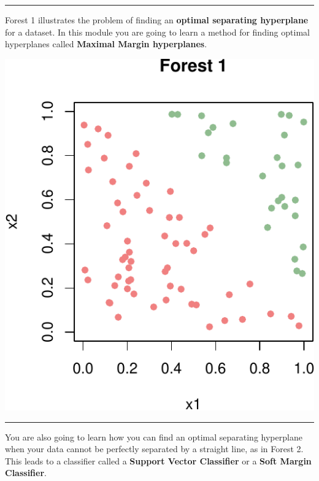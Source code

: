 \documentclass[]{article}
\begin{document}
\begin{center}\rule{0.5\linewidth}{\linethickness}\end{center}

Forest 1 illustrates the problem of finding an \textbf{optimal
separating hyperplane} for a dataset. In this module you are going to
learn a method for finding optimal hyperplanes called \textbf{Maximal
Margin hyperplanes}.

\includegraphics{9SVM_files/figure-latex/unnamed-chunk-2-1.pdf}

\begin{center}\rule{0.5\linewidth}{\linethickness}\end{center}

You are also going to learn how you can find an optimal separating
hyperplane when your data cannot be perfectly separated by a straight
line, as in Forest 2. This leads to a classifier called a
\textbf{Support Vector Classifier} or a \textbf{Soft Margin Classifier}.
\end{document}
